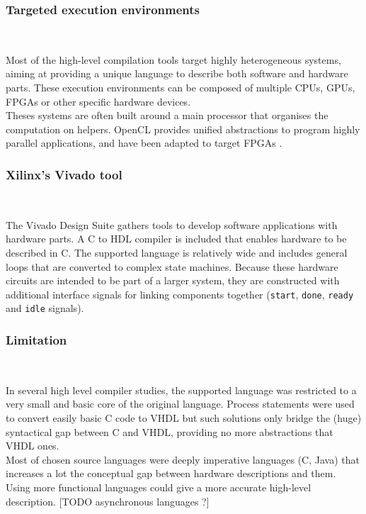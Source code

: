 \documentclass[10pt,a4paper]{article}
\newcommand{\code}{\texttt}
\renewcommand{\indent}{~\\\vspace{-.8cm}}
\begin{document}
\subsubsection{Targeted execution environments} \indent

Most of the high-level compilation tools target highly heterogeneous systems, aiming at providing a unique language to describe both software and hardware parts. These execution environments can be composed of multiple CPUs, GPUs, FPGAs or other specific hardware devices.\\

Theses systems are often built around a main processor that organises the computation on helpers. OpenCL provides unified abstractions to program highly parallel applications, and have been adapted to target FPGAs \cite{czajkowski2012opencl}.


\subsubsection{Xilinx's Vivado tool} \indent

The Vivado Design Suite gathers tools to develop software applications with hardware parts. A C to HDL compiler is included that enables hardware to be described in C. The supported language is relatively wide and includes general loops that are converted to complex state machines. Because these hardware circuits are intended to be part of a larger system, they are constructed with additional interface signals for linking components together (\code {start}, \code {done}, \code {ready} and \code {idle} signals). 


\subsubsection{Limitation} \indent

In several high level compiler studies, the supported language was restricted to a very small and basic core of the original language. Process statements were used to convert easily basic C code to VHDL \cite{parkinson1994c} but such solutions only bridge the (huge) syntactical gap between C and VHDL, providing no more abstractions that VHDL ones.\\


Most of chosen source languages were deeply imperative languages (C, Java) that increases a lot the conceptual gap between hardware descriptions and them. Using more functional languages could give a more accurate high-level description. [TODO asynchronous languages ?]\\
\end{document}

